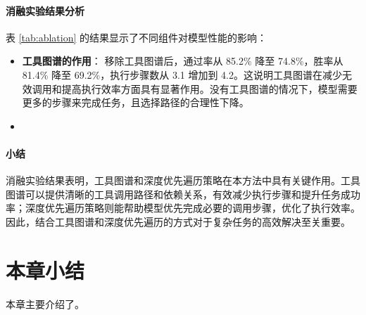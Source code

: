 \paragraph{消融实验结果分析}

表 \ref{tab:ablation} 的结果显示了不同组件对模型性能的影响：

\begin{itemize}
    \item \textbf{工具图谱的作用}：
    移除工具图谱后，通过率从 85.2\% 降至 74.8\%，胜率从 81.4\% 降至 69.2\%，执行步骤数从 3.1 增加到 4.2。这说明工具图谱在减少无效调用和提高执行效率方面具有显著作用。没有工具图谱的情况下，模型需要更多的步骤来完成任务，且选择路径的合理性下降。

    \item \textbf{}

  \end{itemize}

\paragraph{小结}

消融实验结果表明，工具图谱和深度优先遍历策略在本方法中具有关键作用。工具图谱可以提供清晰的工具调用路径和依赖关系，有效减少执行步骤和提升任务成功率；深度优先遍历策略则能帮助模型优先完成必要的调用步骤，优化了执行效率。因此，结合工具图谱和深度优先遍历的方式对于复杂任务的高效解决至关重要。

\section{本章小结}

本章主要介绍了。